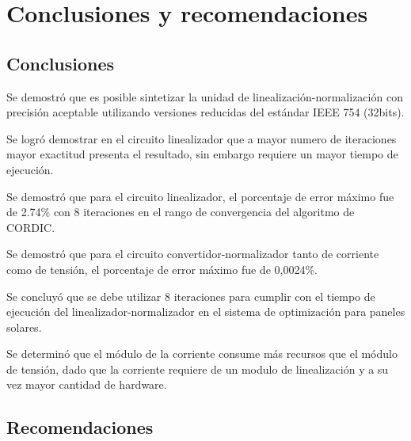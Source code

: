 \chapter{Conclusiones y recomendaciones}

\section{Conclusiones}

\begin{compactitem}

\item Se demostró que es posible sintetizar la unidad de linealización-normalización con precisión aceptable utilizando versiones reducidas del estándar IEEE 754 (32bits).

\item Se logró demostrar en el circuito linealizador que a mayor numero de iteraciones mayor exactitud presenta el resultado, sin embargo requiere un mayor tiempo de ejecución.  

\item Se demostró que para el circuito linealizador, el porcentaje de error máximo  fue de 2.74\% con 8 iteraciones en el rango de convergencia del algoritmo de CORDIC. 

\item Se demostró que para el circuito convertidor-normalizador tanto de corriente como de tensión, el porcentaje de error máximo fue de 0,0024\%.

\item Se concluyó que se debe utilizar 8 iteraciones para cumplir con el tiempo de ejecución del linealizador-normalizador en el sistema de optimización para paneles solares. 

\item Se determinó que el módulo de la corriente consume más recursos que el módulo de tensión, dado que la corriente requiere de un modulo de linealización y a su vez mayor cantidad de hardware. 


\end{compactitem}

\section{Recomendaciones}

